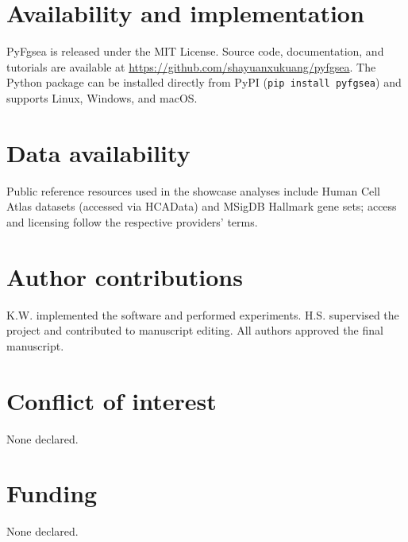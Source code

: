 \section*{Availability and implementation}

PyFgsea is released under the MIT License. Source code, documentation, and tutorials are available at \url{https://github.com/shayuanxukuang/pyfgsea}. The Python package can be installed directly from PyPI (\texttt{pip install pyfgsea}) and supports Linux, Windows, and macOS. 

\section*{Data availability}

 Public reference resources used in the showcase analyses include Human Cell Atlas datasets (accessed via HCAData) and MSigDB Hallmark gene sets; access and licensing follow the respective providers' terms.

\section*{Author contributions}

K.W. implemented the software and performed experiments. H.S. supervised the project and contributed to manuscript editing. All authors approved the final manuscript.

\section*{Conflict of interest}

None declared.

\section*{Funding}

None declared.

